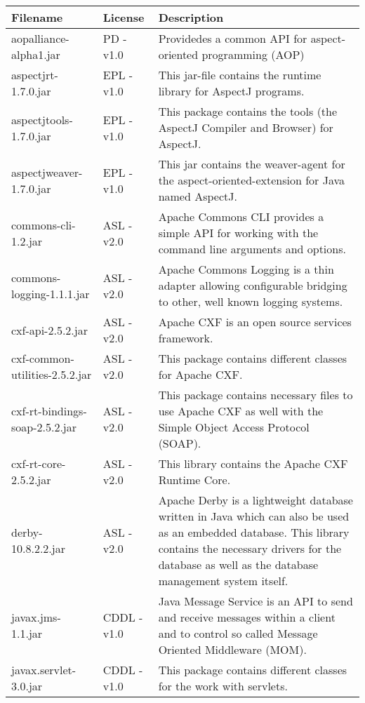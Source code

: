\begin{center}
\begin{longtable}{|p{}|p{}|p{}|}
\hline 
Filename & License & Description\\
\hline
\hline 
aopalliance-alpha1.jar & PD - v1.0 & Providedes a common API for aspect-oriented programming (AOP)\\
\hline 
aspectjrt-1.7.0.jar & EPL - v1.0 & This jar-file contains the runtime library for AspectJ programs.\\
\hline 
aspectjtools-1.7.0.jar & EPL - v1.0 & This package contains the tools (the AspectJ Compiler and Browser) for AspectJ.\\
\hline 
aspectjweaver-1.7.0.jar & EPL - v1.0 & This jar contains the weaver-agent for the aspect-oriented-extension for Java named AspectJ.\\
\hline 
commons-cli-1.2.jar & ASL - v2.0 & Apache Commons CLI provides a simple API for working with the command line arguments and options.\\
\hline 
commons-logging-1.1.1.jar & ASL - v2.0 & Apache Commons Logging is a thin adapter allowing configurable bridging to other, well known logging systems.\\
\hline 
cxf-api-2.5.2.jar & ASL - v2.0 & Apache CXF is an open source services framework.\\
\hline 
cxf-common-utilities-2.5.2.jar & ASL - v2.0 & This package contains different classes for Apache CXF.\\
\hline 
cxf-rt-bindings-soap-2.5.2.jar & ASL - v2.0 & This package contains necessary files to use Apache CXF as well with the Simple Object Access Protocol (SOAP).\\
\hline 
cxf-rt-core-2.5.2.jar & ASL - v2.0 & This library contains the Apache CXF Runtime Core.\\
\hline 
derby-10.8.2.2.jar & ASL - v2.0 & Apache Derby is a lightweight database written in Java which can also be used as an embedded database. This library contains the necessary drivers for the database as well as the database management system itself.\\
\hline 
javax.jms-1.1.jar & CDDL - v1.0 & Java Message Service is an API to send and receive messages within a client and to control so called Message Oriented Middleware (MOM).\\
\hline 
javax.servlet-3.0.jar & CDDL - v1.0 & This package contains different classes for the work with servlets.\\
\hline 

\end{longtable}
\end{center}
